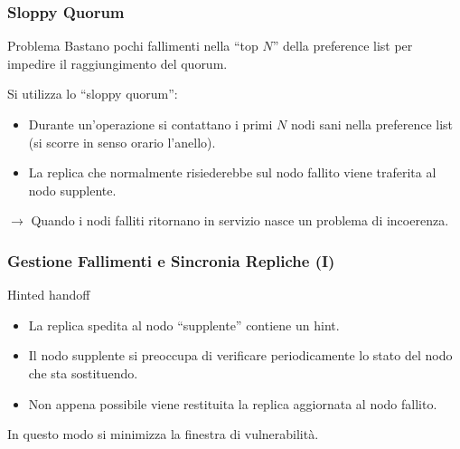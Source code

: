 \begin{frame}
  \frametitle{Sloppy Quorum}
  \begin{block}{Problema}
    Bastano pochi fallimenti nella ``top $N$'' della preference list per impedire il raggiungimento del quorum.    
  \end{block}
  \begin{block}{Si utilizza lo ``sloppy quorum'':}
  \begin{itemize}
  \item Durante un'operazione si contattano i primi $N$ nodi \alert{sani} nella preference list (si scorre in senso orario l'anello).
  \item La replica che normalmente risiederebbe sul nodo fallito viene traferita al nodo supplente.
  \end{itemize}
  \end{block}
  $\longrightarrow$ Quando i nodi falliti ritornano in servizio nasce un problema di incoerenza. 
\end{frame}


\begin{frame}
  \frametitle{Gestione Fallimenti e Sincronia Repliche (I)}
  \begin{block}{Hinted handoff}
  \begin{itemize}
  \item La replica spedita al nodo ``supplente'' contiene un \alert{hint}.
  \item Il nodo supplente si preoccupa di verificare periodicamente lo stato del nodo che sta sostituendo.
  \item Non appena possibile viene restituita la replica aggiornata al nodo fallito.
  \end{itemize}
  In questo modo si minimizza la finestra di vulnerabilità.
  \end{block}
\end{frame}

